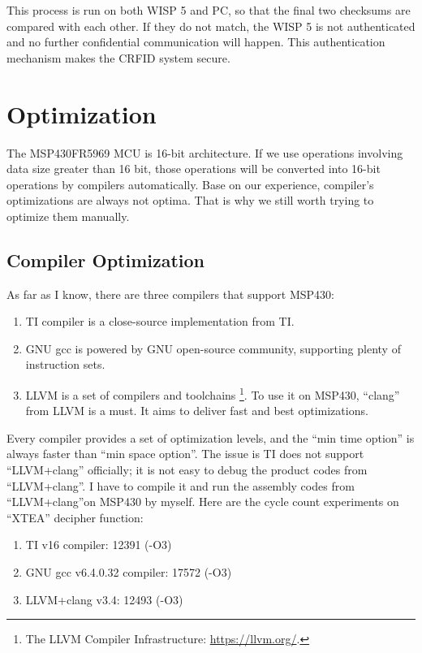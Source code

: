 \documentclass[sigconf, review=false]{acmart}
\begin{document}
This process is run on both WISP 5 and PC, so that the final two checksums are compared with each other.
If they do not match, the WISP 5 is not authenticated and no further confidential communication will happen.
This authentication mechanism makes the CRFID system secure.


\section{Optimization}
The MSP430FR5969 MCU is 16-bit architecture.
If we use operations involving data size greater than 16 bit, those operations will be converted into 16-bit operations by compilers automatically.
Base on our experience, compiler's optimizations are always not optima.
That is why we still worth trying to optimize them manually.

\subsection{Compiler Optimization}
As far as I know, there are three compilers that support MSP430:

\begin{enumerate}
    \item TI compiler is a close-source implementation from TI.
    \item GNU gcc is powered by GNU open-source community, supporting plenty of instruction sets.
    \item LLVM is a set of compilers and toolchains \footnote{The LLVM Compiler Infrastructure: \url{https://llvm.org/}.}.
          To use it on MSP430, ``clang'' from LLVM is a must. It aims to deliver fast and best optimizations.
\end{enumerate}

Every compiler provides a set of optimization levels, and the ``min time option'' is always faster than ``min space option''.
The issue is TI does not support ``LLVM+clang'' officially; it is not easy to debug the product codes from ``LLVM+clang''.
I have to compile it and run the assembly codes from ``LLVM+clang''on MSP430 by myself.
Here are the cycle count experiments on ``XTEA'' decipher function:

\begin{enumerate}
    \item TI v16 compiler: 12391 (-O3)
    \item GNU gcc v6.4.0.32 compiler: 17572 (-O3)
    \item LLVM+clang v3.4: 12493 (-O3)
\end{enumerate}
\end{document}
